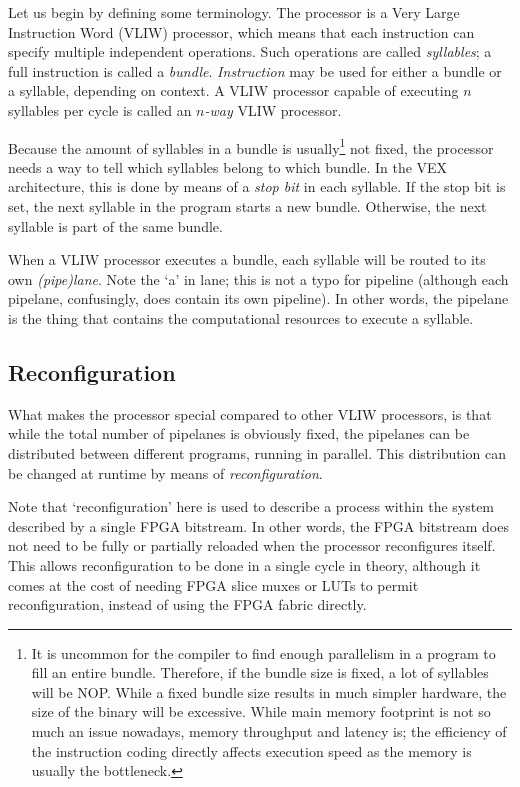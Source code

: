 
\label{sec:core-ug-intro}

Let us begin by defining some terminology. The \rvex{} processor is a Very Large 
Instruction Word (VLIW) processor, which means that each instruction can specify 
multiple independent operations. Such operations are called \textit{syllables}; 
a full instruction is called a \textit{bundle}. \textit{Instruction} may be used 
for either a bundle or a syllable, depending on context. A VLIW processor 
capable of executing $n$ syllables per cycle is called an $n$\textit{-way} VLIW 
processor.

Because the amount of syllables in a bundle is usually\footnote{It is uncommon 
for the compiler to find enough parallelism in a program to fill an entire 
bundle. Therefore, if the bundle size is fixed, a lot of syllables will be NOP. 
While a fixed bundle size results in much simpler hardware, the size of the 
binary will be excessive. While main memory footprint is not so much an issue 
nowadays, memory throughput and latency is; the efficiency of the instruction 
coding directly affects execution speed as the memory is usually the 
bottleneck.} not fixed, the processor needs a way to tell which syllables belong 
to which bundle. In the VEX architecture, this is done by means of a 
\textit{stop bit} in each syllable. If the stop bit is set, the next syllable in 
the program starts a new bundle. Otherwise, the next syllable is part of the 
same bundle.

When a VLIW processor executes a bundle, each syllable will be routed to its own 
\textit{(pipe)lane}. Note the `a' in lane; this is not a typo for pipeline 
(although each pipelane, confusingly, does contain its own pipeline). In other 
words, the pipelane is the thing that contains the computational resources to 
execute a syllable.

\subsection{Reconfiguration}
\label{sec:core-ug-intro-reconf}

What makes the \rvex{} processor special compared to other VLIW processors, is 
that while the total number of pipelanes is obviously fixed, the pipelanes can 
be distributed between different programs, running in parallel. This 
distribution can be changed at runtime by means of \textit{reconfiguration}.

Note that `reconfiguration' here is used to describe a process within the system 
described by a single FPGA bitstream. In other words, the FPGA bitstream does 
not need to be fully or partially reloaded when the \rvex{} processor 
reconfigures itself. This allows reconfiguration to be done in a single cycle in 
theory, although it comes at the cost of needing FPGA slice muxes or LUTs to 
permit reconfiguration, instead of using the FPGA fabric directly.

